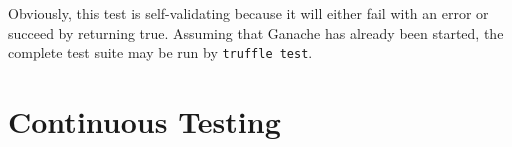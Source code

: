 Obviously, this test is self-validating because it will either fail with an error or succeed by returning true. Assuming that Ganache has already been started, the complete test suite may be run by \texttt{truffle test}. 

\section{Continuous Testing}





